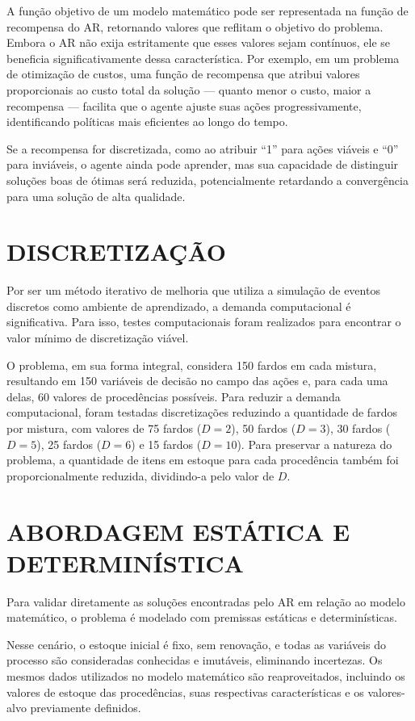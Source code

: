 \documentclass[
    12pt,                %
    openright,           %
    oneside,             %
    a4paper,             %
    english,             %
    spanish,             %
    brazil               %
]{ufscar}
\begin{document}
A função objetivo de um modelo matemático pode ser representada na função de recompensa do AR, retornando valores que reflitam o objetivo do problema. Embora o AR não exija estritamente que esses valores sejam contínuos, ele se beneficia significativamente dessa característica. Por exemplo, em um problema de otimização de custos, uma função de recompensa que atribui valores proporcionais ao custo total da solução — quanto menor o custo, maior a recompensa — facilita que o agente ajuste suas ações progressivamente, identificando políticas mais eficientes ao longo do tempo.

Se a recompensa for discretizada, como ao atribuir ``1'' para ações viáveis e ``0'' para inviáveis, o agente ainda pode aprender, mas sua capacidade de distinguir soluções boas de ótimas será reduzida, potencialmente retardando a convergência para uma solução de alta qualidade. 

\section{DISCRETIZAÇÃO}

Por ser um método iterativo de melhoria que utiliza a simulação de eventos discretos como ambiente de aprendizado, a demanda computacional é significativa. Para isso, testes computacionais foram realizados para encontrar o valor mínimo de discretização viável. 

O problema, em sua forma integral, considera 150 fardos em cada mistura, resultando em 150 variáveis de decisão no campo das ações e, para cada uma delas, 60 valores de procedências possíveis. Para reduzir a demanda computacional, foram testadas discretizações reduzindo a quantidade de fardos por mistura, com valores de 75 fardos (\(D=2\)), 50 fardos (\(D=3\)), 30 fardos (\(D=5\)), 25 fardos (\(D=6\)) e 15 fardos (\(D=10\)). Para preservar a natureza do problema, a quantidade de itens em estoque para cada procedência também foi proporcionalmente reduzida, dividindo-a pelo valor de \(D\).


\section{ABORDAGEM ESTÁTICA E DETERMINÍSTICA}

Para validar diretamente as soluções encontradas pelo AR em relação ao modelo matemático, o problema é modelado com premissas estáticas e determinísticas.

Nesse cenário, o estoque inicial é fixo, sem renovação, e todas as variáveis do processo são consideradas conhecidas e imutáveis, eliminando incertezas. Os mesmos dados utilizados no modelo matemático são reaproveitados, incluindo os valores de estoque das procedências, suas respectivas características e os valores-alvo previamente definidos.
\end{document}
